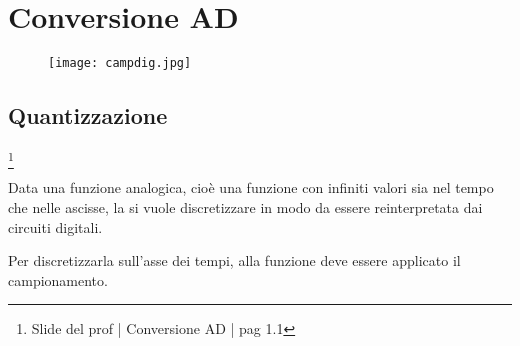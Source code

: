 \chapter{Conversione AD}

\begin{figure}[h]
    \centering
    \texttt{[image: campdig.jpg]}
\end{figure}

\newpage 

\section{Quantizzazione}
\footnote{Slide del prof | Conversione AD | pag 1.1 
}

Data una funzione analogica, cioè una funzione con infiniti valori sia nel tempo che nelle ascisse, 
la si vuole discretizzare in modo da essere reinterpretata dai circuiti digitali. \newline 

Per discretizzarla sull'asse dei tempi, alla funzione deve essere applicato il campionamento. \newline 

